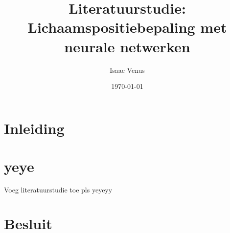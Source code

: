 \documentclass[a4paper,kulak]{kulakarticle} %
\date{\today}
\title{Literatuurstudie: Lichaamspositiebepaling met neurale netwerken}
\author{Isaac Venus}
\begin{document}
\maketitle

\section*{Inleiding}
\section{yeye}
Voeg literatuurstudie toe pls yeyeyy
\section*{Besluit}
\end{document}
